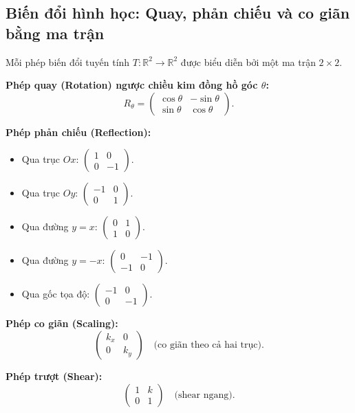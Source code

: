 \documentclass[12pt,a4paper]{article}
\begin{document}
\subsection{Biến đổi hình học: Quay, phản chiếu và co giãn bằng ma trận}

\begin{congthuc}[title={Ma trận biến đổi hình học trong $\mathbb{R}^2$}]
  Mỗi phép biến đổi tuyến tính $T: \mathbb{R}^2 \to \mathbb{R}^2$ được biểu diễn bởi một ma trận $2\times 2$.

  \textbf{Phép quay (Rotation) ngược chiều kim đồng hồ góc $\theta$:}
  \[
    R_\theta = \begin{pmatrix}\cos\theta & -\sin\theta \\ \sin\theta & \cos\theta\end{pmatrix}.
  \]

  \textbf{Phép phản chiếu (Reflection):}
  \begin{itemize}
    \item Qua trục $Ox$: $\begin{pmatrix}1 & 0 \\ 0 & -1\end{pmatrix}$.
    \item Qua trục $Oy$: $\begin{pmatrix}-1 & 0 \\ 0 & 1\end{pmatrix}$.
    \item Qua đường $y = x$: $\begin{pmatrix}0 & 1 \\ 1 & 0\end{pmatrix}$.
    \item Qua đường $y = -x$: $\begin{pmatrix}0 & -1 \\ -1 & 0\end{pmatrix}$.
    \item Qua gốc tọa độ: $\begin{pmatrix}-1 & 0 \\ 0 & -1\end{pmatrix}$.
  \end{itemize}

  \textbf{Phép co giãn (Scaling):}
  \[
    \begin{pmatrix}k_x & 0 \\ 0 & k_y\end{pmatrix} \quad \text{(co giãn theo cả hai trục)}.
  \]

  \textbf{Phép trượt (Shear):}
  \[
    \begin{pmatrix}1 & k \\ 0 & 1\end{pmatrix} \quad \text{(shear ngang)}.
  \]
\end{congthuc}
\end{document}
